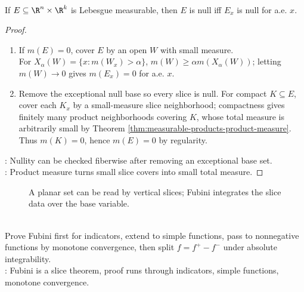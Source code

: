 \begin{theorem} \label{thm:zero-slices-null-set-criterion} \\
If $E\subseteq\R^n\times\R^k$ is Lebesgue measurable, then $E$ is null iff $E_x$ is null for a.e. $x$.
\begin{proof}
\begin{enumerate}[label=\roman*.]
\setlength{\itemsep}{0pt}
\item[$(\Rightarrow)$] If $m(E)=0$, cover $E$ by an open $W$ with small measure.\\
For $X_\alpha(W)=\{x:m(W_x)>\alpha\}$, $m(W)\geq \alpha m(X_\alpha(W))$; letting $m(W)\to0$ gives $m(E_x)=0$ for a.e. $x$.
\item[$(\Leftarrow)$] Remove the exceptional null base so every slice is null. For compact $K\subseteq E$, cover each $K_x$ by a small-measure slice neighborhood; compactness gives finitely many product neighborhoods covering $K$, whose total measure is arbitrarily small by Theorem \ref{thm:measurable-products-product-measure}. Thus $m(K)=0$, hence $m(E)=0$ by regularity.
\end{enumerate}
: Nullity can be checked fiberwise after removing an exceptional base set.\\
: Product measure turns small slice covers into small total measure.
\end{proof}
\end{theorem}

\begin{figure}[H]
  \centering
  
  \caption{A planar set can be read by vertical slices; Fubini integrates the slice data over the base variable.}
  \label{fig:cavalieri-slicing-planar-set}
\end{figure}

\begin{perspective} \label{per:fubini-proof-ladder} \\
Prove Fubini first for indicators, extend to simple functions, pass to nonnegative functions by monotone convergence, then split $f=f^+-f^-$ under absolute integrability.\\
: Fubini is a slice theorem, proof runs through indicators, simple functions, monotone convergence.
\end{perspective}

